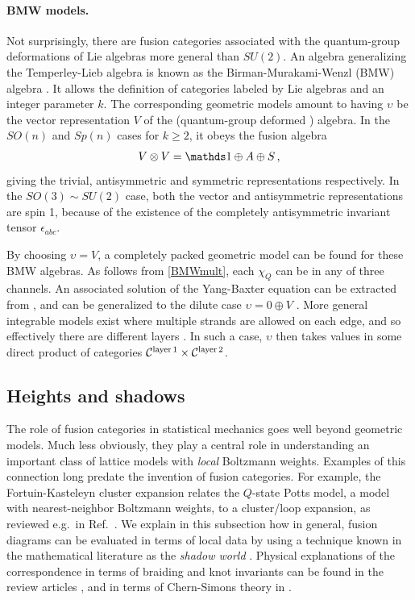 \paragraph{BMW models.} 
Not surprisingly, there are fusion categories associated with the quantum-group deformations of Lie algebras more general than $SU(2)$.
An algebra generalizing the Temperley-Lieb algebra is known as the Birman-Murakami-Wenzl (BMW) algebra \cite{birman1989,murakami1990}.
It allows the definition of categories labeled by Lie algebras and an integer parameter $k$.
The corresponding geometric models amount to having $\upsilon$ be the vector representation $V$ of the (quantum-group deformed \cite{Gomez1996}) algebra.
In the $SO(n)$ and $Sp(n)$ cases for $k\ge 2$, it obeys the fusion algebra
\begin{align}
V\otimes V = \I \oplus A\oplus S \,,
\label{BMWmult}
\end{align}
giving the trivial, antisymmetric and symmetric representations respectively.
In the $SO(3) \sim SU(2)$ case, both the vector and antisymmetric representations are spin 1, because of the existence of the completely antisymmetric invariant tensor $\epsilon_{abc}$.

By choosing  $\upsilon=V$, a completely packed geometric model can be found for these BMW algebras. As follows from \eqref{BMWmult}, each $\chi_Q$ can be in any of three channels.
An associated solution of the Yang-Baxter equation can be extracted from \cite{Jimbo:1987}, and can be generalized to the dilute case $\upsilon=0\oplus V$  \cite{Grimm1994}.
More general integrable models exist where multiple strands are allowed on each edge, and so effectively there are different layers  \cite{Grimm1995}.
In such a case, $\upsilon$ then takes values in some direct product of categories $\mathcal{C}^{\text{layer}\,1}  \times \mathcal{C}^{\text{layer}\,2}$.





\subsection{Heights and shadows}
\label{sec:shadow}

The role of fusion categories in statistical mechanics goes well beyond geometric models.
Much less obviously, they play a central role in understanding an important class of lattice models with {\em local} Boltzmann weights.
Examples of this connection long predate the invention of fusion categories.  For example, the Fortuin-Kasteleyn cluster expansion relates the $Q$-state Potts model, a model with nearest-neighbor Boltzmann weights, to a cluster/loop expansion, as reviewed e.g.\ in Ref.~\cite{Baxter1982}.
We explain in this subsection how in general, fusion diagrams can be evaluated in terms of local data by using a technique known in the mathematical literature as the \emph{shadow world} \cite{Reshetikhin1988,turaev1990,turaev1992,kauffman1993,turaev2016quantum}.
Physical explanations of the correspondence in terms of braiding and knot invariants can be found in the review articles \cite{Wadati1989,Wu1992}, and in terms of Chern-Simons theory in \cite{Witten:1989}. 

